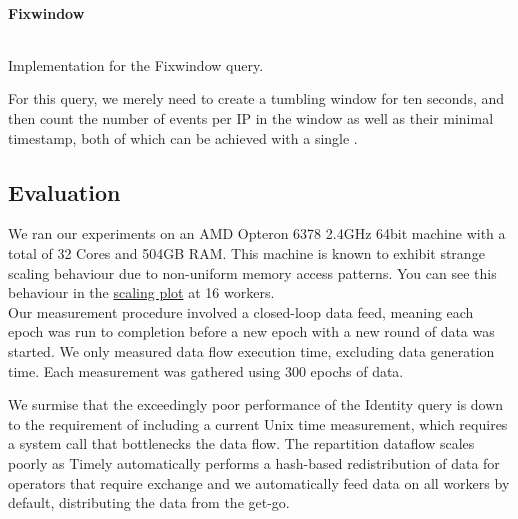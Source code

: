 \paragraph{Fixwindow}
\begin{listing}[H]
  \inputminted[firstline=205,lastline=209]{rust}{benchmarks/src/hibench.rs}
  \caption{Implementation for the Fixwindow query.}
  \label{lst:hibench-fixwindow}
\end{listing}

For this query, we merely need to create a tumbling window for ten seconds, and then count the number of events per IP in the window as well as their minimal timestamp, both of which can be achieved with a single .

\subsection{Evaluation}
We ran our experiments on an AMD Opteron 6378 2.4GHz 64bit machine with a total of 32 Cores and 504GB RAM. This machine is known to exhibit strange scaling behaviour due to non-uniform memory access patterns. You can see this behaviour in the \hyperref[figure:ysb-scaling]{scaling plot} at 16 workers. \\

Our measurement procedure involved a closed-loop data feed, meaning each epoch was run to completion before a new epoch with a new round of data was started. We only measured data flow execution time, excluding data generation time. Each measurement was gathered using 300 epochs of data. \\


We surmise that the exceedingly poor performance of the Identity query is down to the requirement of including a current Unix time measurement, which requires a system call that bottlenecks the data flow. The repartition dataflow scales poorly as Timely automatically performs a hash-based redistribution of data for operators that require exchange and we automatically feed data on all workers by default, distributing the data from the get-go.

